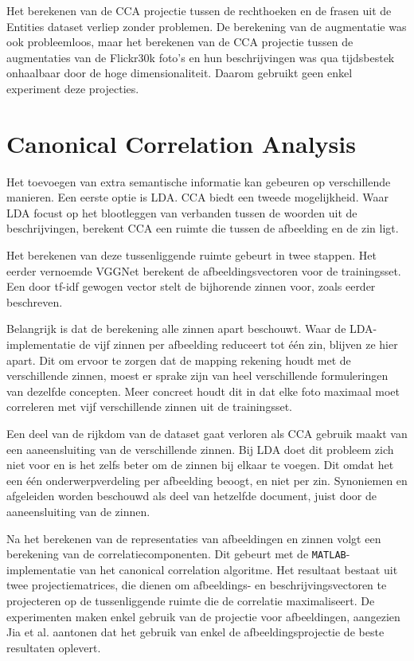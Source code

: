 Het berekenen van de CCA projectie tussen de rechthoeken en de frasen uit de Entities dataset verliep zonder problemen. De berekening van de augmentatie was ook probleemloos, maar het berekenen van de CCA projectie tussen de augmentaties van de Flickr30k foto's en hun beschrijvingen was qua tijdsbestek onhaalbaar door de hoge dimensionaliteit. Daarom gebruikt geen enkel experiment deze projecties. 



\section{Canonical Correlation Analysis}
Het toevoegen van extra semantische informatie kan gebeuren op verschillende manieren. Een eerste optie is LDA. CCA biedt een tweede mogelijkheid. Waar LDA focust op het blootleggen van verbanden tussen de woorden uit de beschrijvingen, berekent CCA een ruimte die tussen de afbeelding en de zin ligt.

Het berekenen van deze tussenliggende ruimte gebeurt in twee stappen. Het eerder vernoemde VGGNet berekent de afbeeldingsvectoren voor de trainingsset. Een door tf-idf gewogen vector stelt de bijhorende zinnen voor, zoals eerder beschreven. 

Belangrijk is dat de berekening alle zinnen apart beschouwt. Waar de LDA-implementatie de vijf zinnen per afbeelding reduceert tot \'e\'en zin, blijven ze hier apart. Dit om ervoor te zorgen dat de mapping rekening houdt met de verschillende zinnen, moest er sprake zijn van heel verschillende formuleringen van dezelfde concepten. Meer concreet houdt dit in dat elke foto maximaal moet correleren met vijf verschillende zinnen uit de trainingsset. 

Een deel van de rijkdom van de dataset gaat verloren als CCA gebruik maakt van een aaneensluiting van de verschillende zinnen. Bij LDA doet dit probleem zich niet voor en is het zelfs beter om de zinnen bij elkaar te voegen. Dit omdat het een \'e\'en onderwerpverdeling per afbeelding beoogt, en niet per zin. Synoniemen en afgeleiden worden beschouwd als deel van hetzelfde document, juist door de aaneensluiting van de zinnen.

Na het berekenen van de representaties van afbeeldingen en zinnen volgt een berekening van de correlatiecomponenten. Dit gebeurt met de \texttt{MATLAB}-implementatie van het canonical correlation algoritme. Het resultaat bestaat uit twee projectiematrices, die dienen om afbeeldings- en beschrijvingsvectoren te projecteren op de tussenliggende ruimte die de correlatie maximaliseert. De experimenten maken enkel gebruik van de projectie voor afbeeldingen, aangezien Jia et al.\cite{Fernando2015} aantonen dat het gebruik van enkel de afbeeldingsprojectie de beste resultaten oplevert.



